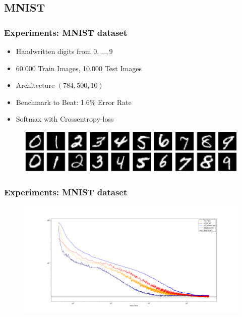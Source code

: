 \subsection{MNIST}
\begin{frame}
\frametitle{Experiments: MNIST dataset}
\begin{itemize}
\item[] Handwritten digits from $0,\ldots,9$
\item[] 60.000 Train Images, 10.000 Test Images 
\item[] Architecture $(784,500,10)$
\item[] Benchmark to Beat: 1.6\% Error Rate
\item[] Softmax with Crossentropy-loss
\end{itemize}
\begin{figure}[h]      
	\centering      
	\hspace*{-0.6cm}
	\includegraphics[scale=0.4, trim={40, 0, 0, 0}]{Bilder/MNIST_Data}    
\end{figure}
\end{frame}

\begin{frame}
\frametitle{Experiments: MNIST dataset}
\begin{figure}[h]      
	\centering      
	\hspace*{-0.6cm}
	\includegraphics[scale=0.26, trim={50, 0, 0, 50}]{Bilder/Figure_1}    
\end{figure}
\end{frame}





